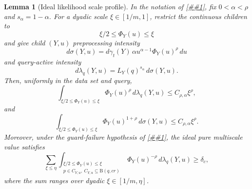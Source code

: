 \documentclass[10pt]{article}
\newcommand{\cref}[1]{\ref{##1}}
\newtheorem{lemma}[theorem]{Lemma}
\theoremstyle{definition}
\newcommand{\Ball}{\mathrm{B}}
\begin{document}
\begin{lemma}[Ideal likelihood scale profile]\label{lem:ideal-likelihood-scale-profile}
   In the notation of \cref{thm:continuous-likelihood-balls}, fix $0<\alpha<\rho$ and $s_\alpha=1-\alpha$. For a dyadic scale $\xi\in[1/m,1]$, restrict the continuous children to
   \[
      \xi/2\le \Phi_Y(u)\le \xi
   \]
   and give child $(Y,u)$ preprocessing intensity
   \[
      d\sigma(Y,u)=d\gamma_t(Y)\,\alpha u^{\alpha-1}\Phi_Y(u)^\rho\,du
   \]
   and query-active intensity
   \[
      d\lambda_q(Y,u)=L_Y(q)^{s_\alpha}\,d\sigma(Y,u).
   \]
   Then, uniformly in the data set and query,
   \[
      \int_{\xi/2\le\Phi_Y(u)\le\xi}
      \Phi_Y(u)^\rho\,d\lambda_q(Y,u)
      \le
      C_{\rho,\alpha}\xi^\rho,
   \]
   and
   \[
      \int_{\xi/2\le\Phi_Y(u)\le\xi}
      \Phi_Y(u)^{1+\rho}\,d\sigma(Y,u)
      \le
      C_{\rho,\alpha}\xi^\rho.
   \]
   Moreover, under the guard-failure hypothesis of \cref{thm:continuous-likelihood-balls}, the ideal pure multiscale value satisfies
   \[
      \sum_{\xi\le\eta}
      \int_{\substack{\xi/2\le\Phi_Y(u)\le\xi\\
                      p\in C_{Y,u},\ C_{Y,u}\subseteq\Ball(q,cr)}}
      \Phi_Y(u)^{-\rho}\,d\lambda_q(Y,u)
      \ge
      \delta_c,
   \]
   where the sum ranges over dyadic $\xi\in[1/m,\eta]$.
\end{lemma}
\end{document}
